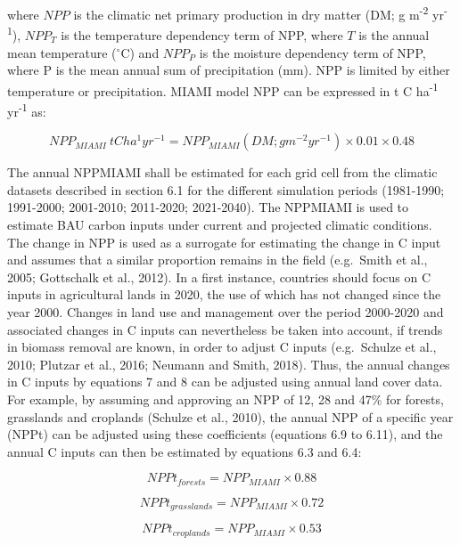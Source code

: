 \documentclass[
  10pt,
  b5paper,
]{book}
\begin{document}
where \(NPP\) is the climatic net primary production in dry matter (DM; g m\textsuperscript{-2} yr\textsuperscript{-1}), \(NPP_T\) is the temperature dependency term of NPP, where \(T\) is the annual mean temperature (\(^\circ\)C) and \(NPP_P\) is the moisture dependency term of NPP, where P is the mean annual sum of precipitation (mm). NPP is limited by either temperature or precipitation. MIAMI model NPP can be expressed in t C ha\textsuperscript{-1} yr\textsuperscript{-1} as:

\begin{equation}
\tag{6.9}
NPP_{MIAMI} \ tC ha^1 yr^{-1} = NPP_{MIAMI} (DM; g m^{-2} yr^{-1}) \times 0.01 \times 0.48                  
\end{equation}

The annual NPPMIAMI shall be estimated for each grid cell from the climatic datasets described in section 6.1 for the different simulation periods (1981-1990; 1991-2000; 2001-2010; 2011-2020; 2021-2040). The NPPMIAMI is used to estimate BAU carbon inputs under current and projected climatic conditions.
The change in NPP is used as a surrogate for estimating the change in C input and assumes that a similar proportion remains in the field (e.g.~Smith et al., 2005; Gottschalk et al., 2012). In a first instance, countries should focus on C inputs in agricultural lands in 2020, the use of which has not changed since the year 2000. Changes in land use and management over the period 2000-2020 and associated changes in C inputs can nevertheless be taken into account, if trends in biomass removal are known, in order to adjust C inputs (e.g.~Schulze et al., 2010; Plutzar et al., 2016; Neumann and Smith, 2018). Thus, the annual changes in C inputs by equations 7 and 8 can be adjusted using annual land cover data. For example, by assuming and approving an NPP of 12, 28 and 47\% for forests, grasslands and croplands (Schulze et al., 2010), the annual NPP of a specific year (NPPt) can be adjusted using these coefficients (equations 6.9 to 6.11), and the annual C inputs can then be estimated by equations 6.3 and 6.4:

\begin{equation}
\tag{6.10}
NPPt_{forests} = NPP_{MIAMI} \times 0.88				 
\end{equation}

\begin{equation}
\tag{6.11}
NPPt_{grasslands} = NPP_{MIAMI} \times 0.72	
\end{equation}

\begin{equation}
\tag{6.12}
NPPt_{croplands} = NPP_{MIAMI} \times 0.53
\end{equation}
\end{document}
